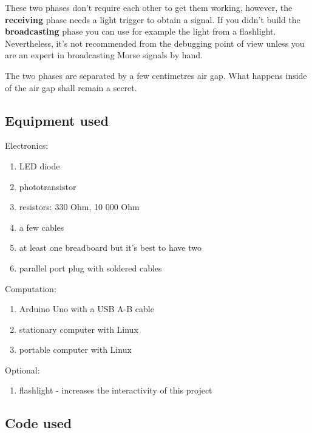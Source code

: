 \documentclass[10pt]{report}
\begin{document}
These two phases don't require each other to get them working, however, the \textbf{receiving} phase needs a light trigger to obtain a signal. If you didn't build the  \textbf{broadcasting} phase you can use for example the light from a flashlight. Nevertheless, it's not recommended from the debugging point of view unless you are an expert in broadcasting Morse signals by hand.

The two phases are separated by a few centimetres air gap. What happens inside of the air gap shall remain a secret.

\subsection{Equipment used} 

Electronics:

\begin{enumerate}

\item LED diode
\item phototransistor
\item resistors: 330 Ohm, 10 000 Ohm
\item a few cables
\item at least one breadboard but it's best to have two
\item parallel port plug with soldered cables

\end{enumerate}

\newpage

Computation:

\begin{enumerate}

\item Arduino Uno with a USB A-B cable
\item stationary computer with Linux
\item portable computer with Linux

\end{enumerate}

Optional:

\begin{enumerate}

\item flashlight - increases the interactivity of this project

\end{enumerate}


\subsection{Code used}
\end{document}
